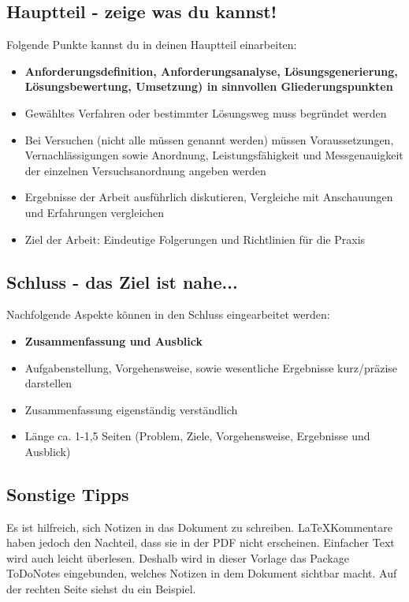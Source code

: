 \subsection{Hauptteil - zeige was du kannst!}
Folgende Punkte kannst du in deinen Hauptteil einarbeiten:
\begin{itemize}
\item \textbf{Anforderungsdefinition, Anforderungsanalyse, Lösungsgenerierung, Lösungsbewertung, Umsetzung) in sinnvollen Gliederungspunkten}
\item Gewähltes Verfahren oder bestimmter Lösungsweg muss begründet werden
\item Bei Versuchen (nicht alle müssen genannt werden) müssen Voraussetzungen, Vernachlässigungen sowie Anordnung, Leistungsfähigkeit und Messgenauigkeit der einzelnen Versuchsanordnung angeben werden
\item Ergebnisse der Arbeit ausführlich diskutieren, Vergleiche mit Anschauungen und Erfahrungen vergleichen
\item Ziel der Arbeit: Eindeutige Folgerungen und Richtlinien für die Praxis
\end{itemize}

\subsection{Schluss - das Ziel ist nahe...}
Nachfolgende Aspekte können in den Schluss eingearbeitet werden:
\begin{itemize}
\item \textbf{Zusammenfassung und Ausblick}
\item Aufgabenstellung, Vorgehensweise, sowie wesentliche Ergebnisse kurz/präzise darstellen
\item Zusammenfassung eigenständig verständlich
\item Länge ca. 1-1,5 Seiten (Problem, Ziele, Vorgehensweise, Ergebnisse und Ausblick)
\end{itemize}

\subsection{Sonstige Tipps}
Es ist hilfreich, sich Notizen in das Dokument zu schreiben.
\LaTeX Kommentare haben jedoch den Nachteil, dass sie in der PDF nicht erscheinen.
Einfacher Text wird auch leicht überlesen.
Deshalb wird in dieser Vorlage das Package ToDoNotes eingebunden, welches Notizen in dem Dokument sichtbar macht.
Auf der rechten Seite siehst du ein Beispiel.
